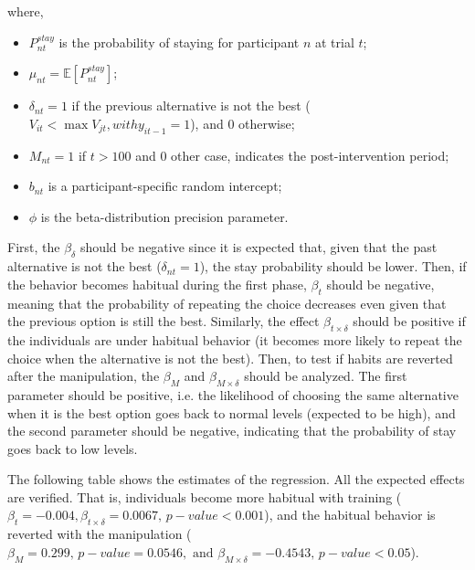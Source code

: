 \documentclass[man,natbib,floatsintext]{apa7}
\begin{document}
where,

\begin{itemize}
    \item $P^{stay}_{nt}$ is the probability of staying for participant $n$ at trial $t$;
    \item $\mu_{nt} = \mathbb{E}[P^{stay}_{nt}]$;
    \item $\delta_{nt} = 1$ if the previous alternative is not the best ($V_{it}< \max{V_{jt}}, with y_{it-1}=1$), and $0$ otherwise;
    \item $M_{nt}=1$ if $t>100$ and 0 other case, indicates the post-intervention period;
    \item $b_{nt}$ is a participant-specific random intercept;
    \item $\phi$ is the beta-distribution precision parameter.
\end{itemize}

First, the $\beta_{\delta}$ should be negative since it is expected that, given that the past alternative is not the best ($\delta_{nt}=1$), the stay probability should be lower. Then, if the behavior becomes habitual during the first phase, $\beta_t$ should be negative, meaning that the probability of repeating the choice decreases even  given that the previous option is still the best. Similarly, the effect $\beta_{t\times \delta}$ should be positive if the individuals are under habitual behavior (it becomes more likely to repeat the choice when the alternative is not the best). Then, to test if habits are reverted after the manipulation, the $\beta_M$ and $\beta_{M\times \delta}$ should be analyzed. The first parameter should be positive, i.e. the likelihood of choosing the same alternative when it is the best option goes back to normal levels (expected to be high), and the second parameter should be negative, indicating that the probability of stay goes back to low levels. 

The following table shows the estimates of the regression. All the expected effects are verified. That is, individuals become more habitual with training ( $\beta_{t}=-0.004, \beta_{t\times \delta}=0.0067,\,p-value<0.001$), and the habitual behavior is reverted with the manipulation ($\beta_{M}=0.299,\,p-value=0.0546,\text{ and } \beta_{M\times \delta}=-0.4543,\, p-value<0.05$).
\end{document}
